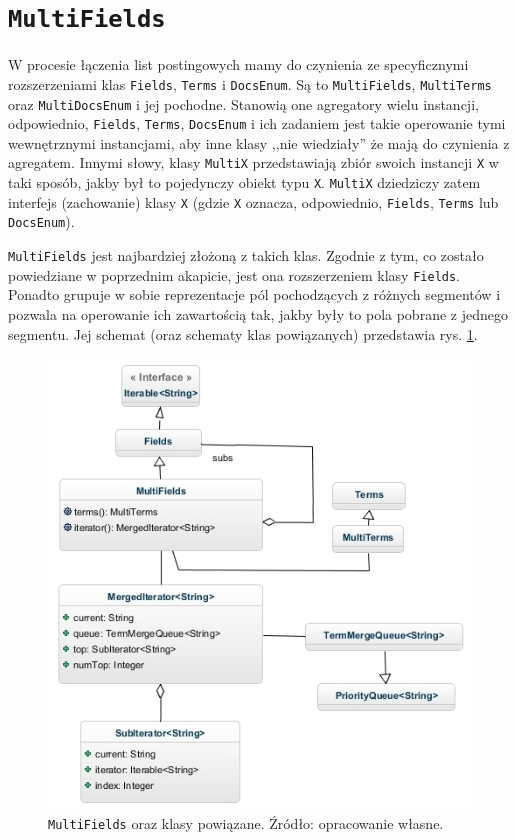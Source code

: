 \section{\texttt{MultiFields}}

W procesie łączenia list postingowych mamy do czynienia ze specyficznymi rozszerzeniami klas \texttt{Fields}, \texttt{Terms} i \texttt{DocsEnum}. Są to \texttt{MultiFields}, \texttt{MultiTerms} oraz \texttt{MultiDocsEnum} i jej pochodne. Stanowią one agregatory wielu instancji, odpowiednio, \texttt{Fields}, \texttt{Terms}, \texttt{DocsEnum} i ich zadaniem jest takie operowanie tymi wewnętrznymi instancjami, aby inne klasy ,,nie wiedziały'' że mają do czynienia z agregatem. Innymi słowy, klasy \texttt{MultiX} przedstawiają zbiór swoich instancji \texttt{X} w taki sposób, jakby był to pojedynczy obiekt typu \texttt{X}. \texttt{MultiX} dziedziczy zatem interfejs (zachowanie) klasy \texttt{X} (gdzie \texttt{X} oznacza, odpowiednio, \texttt{Fields}, \texttt{Terms} lub \texttt{DocsEnum}).

\texttt{MultiFields} jest najbardziej złożoną z takich klas. Zgodnie z tym, co zostało powiedziane w poprzednim akapicie, jest ona rozszerzeniem klasy \texttt{Fields}. Ponadto grupuje w sobie reprezentacje pól pochodzących z różnych segmentów i pozwala na operowanie ich zawartością tak, jakby były to pola pobrane z jednego segmentu. Jej schemat (oraz schematy klas powiązanych) przedstawia rys. \ref{multiFields}.

\begin{figure}[here]
 \includegraphics[scale=0.65]{pictures/MultiFields_2.jpg}
 \caption{\texttt{MultiFields} oraz klasy powiązane. Źródło: opracowanie własne.\label{multiFields}}
\end{figure}

